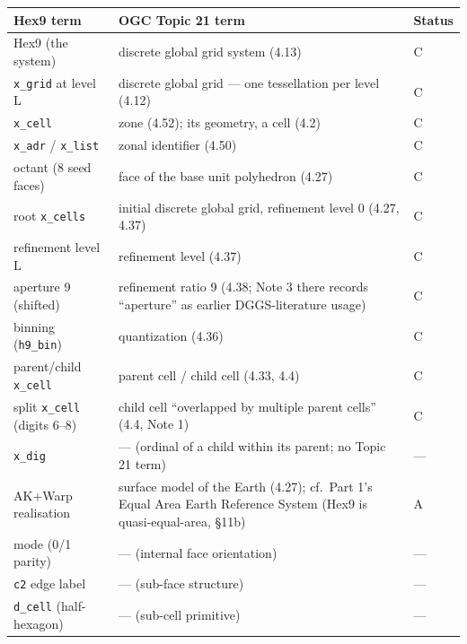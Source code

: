 \documentclass[
  11pt,
  a4paper,
]{article}
\newcounter{none} %
\begin{document}
{\def\LTcaptype{none} %
\begin{longtable}[]{@{}
  >{\raggedright\arraybackslash}p{}
  >{\raggedright\arraybackslash}p{}
  >{\raggedright\arraybackslash}p{}@{}}
\toprule\noalign{}
\begin{minipage}[b]{\linewidth}\raggedright
Hex9 term
\end{minipage} & \begin{minipage}[b]{\linewidth}\raggedright
OGC Topic 21 term
\end{minipage} & \begin{minipage}[b]{\linewidth}\raggedright
Status
\end{minipage} \\
\midrule\noalign{}
\endhead
\bottomrule\noalign{}
\endlastfoot
Hex9 (the system) & discrete global grid system (4.13) & C \\
\texttt{x\_grid} at level L & discrete global grid --- one tessellation
per level (4.12) & C \\
\texttt{x\_cell} & zone (4.52); its geometry, a cell (4.2) & C \\
\texttt{x\_adr} / \texttt{x\_list} & zonal identifier (4.50) & C \\
octant (8 seed faces) & face of the base unit polyhedron (4.27) & C \\
12 root \texttt{x\_cells} & initial discrete global grid, refinement
level 0 (4.27, 4.37) & C \\
refinement level L & refinement level (4.37) & C \\
aperture 9 (shifted) & refinement ratio 9 (4.38; Note 3 there records
``aperture'' as earlier DGGS-literature usage) & C \\
binning (\texttt{h9\_bin}) & quantization (4.36) & C \\
parent/child \texttt{x\_cell} & parent cell / child cell (4.33, 4.4) &
C \\
split \texttt{x\_cell} (digits 6--8) & child cell ``overlapped by
multiple parent cells'' (4.4, Note 1) & C \\
\texttt{x\_dig} & --- (ordinal of a child within its parent; no Topic 21
term) & --- \\
AK+Warp realisation & surface model of the Earth (4.27); cf.~Part 1's
Equal Area Earth Reference System (Hex9 is quasi-equal-area, §11b) &
A \\
mode (0/1 parity) & --- (internal face orientation) & --- \\
\texttt{c2} edge label & --- (sub-face structure) & --- \\
\texttt{d\_cell} (half-hexagon) & --- (sub-cell primitive) & --- \\
\end{longtable}
}
\end{document}

